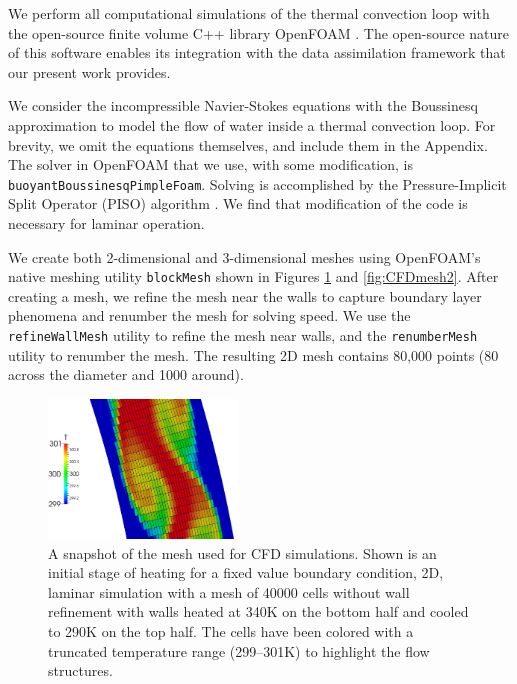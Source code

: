 \documentclass[pre,twocolumn,twoside,byrevtex,superscriptaddress]{revtex4}
\begin{document}
We perform all computational simulations of the thermal convection loop with the open-source finite volume C++ library OpenFOAM \cite{jasak2007}.
The open-source nature of this software enables its integration with the data assimilation framework that our present work provides.

We consider the incompressible Navier-Stokes equations with the Boussinesq approximation to model the flow of water inside a thermal convection loop.
For brevity, we omit the equations themselves, and include them in the Appendix.
The solver in OpenFOAM that we use, with some modification, is \verb|buoyantBoussinesqPimpleFoam|.
Solving is accomplished by the Pressure-Implicit Split Operator (PISO) algorithm \cite{issa1986solution}.
We find that modification of the code is necessary for laminar operation.

We create both 2-dimensional and 3-dimensional meshes using OpenFOAM's native meshing utility \verb|blockMesh| shown in Figures \ref{fig:CFDmesh1} and \ref{fig:CFDmesh2}.
After creating a mesh, we refine the mesh near the walls to capture boundary layer phenomena and renumber the mesh for solving speed.
We use the \verb|refineWallMesh| utility to refine the mesh near walls, and the \verb|renumberMesh| utility to renumber the mesh.
The resulting 2D mesh contains 80,000 points (80 across the diameter and 1000 around).

\begin{figure}[h]
  \centering
  \includegraphics[width=0.45\textwidth]{fig03_heating_zoom_mesh4.pdf}
  \caption[A snapshot of the mesh used for CFD simulations]{
    A snapshot of the mesh used for CFD simulations.
    Shown is an initial stage of heating for a fixed value boundary condition, 2D, laminar simulation with a mesh of 40000 cells without wall refinement with walls heated at 340K on the bottom half and cooled to 290K on the top half.
    The cells have been colored with a truncated temperature range (299--301K) to highlight the flow structures.
  }
  \label{fig:CFDmesh1}
\end{figure}
\end{document}
